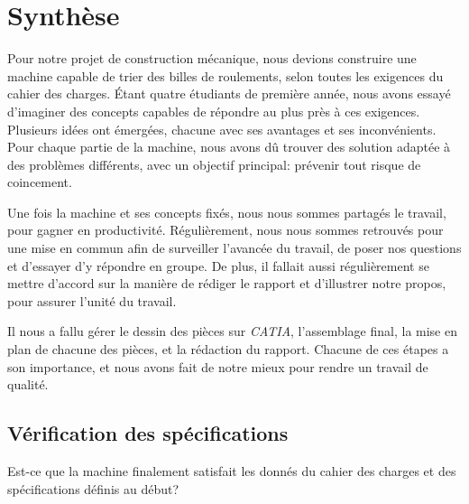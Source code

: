 \chapter{Synthèse}
Pour notre projet de construction mécanique, nous devions construire une machine capable de trier des billes de roulements, selon toutes les exigences du cahier des charges. Étant quatre étudiants de première année, nous avons essayé d'imaginer des concepts capables de répondre au plus près à ces exigences. Plusieurs idées ont émergées, chacune avec ses avantages et ses inconvénients. Pour chaque partie de la machine, nous avons dû trouver des solution adaptée à des problèmes différents, avec un objectif principal: prévenir tout risque de coincement.

Une fois la machine et ses concepts fixés, nous nous sommes partagés le travail, pour gagner en productivité. Régulièrement, nous nous sommes retrouvés pour une mise en commun afin de surveiller l'avancée du travail, de poser nos questions et d'essayer d'y répondre en groupe. De plus, il fallait aussi régulièrement se mettre d'accord sur la manière de rédiger le rapport et d'illustrer notre propos, pour assurer l'unité du travail. 

Il nous a fallu gérer le dessin des pièces sur \emph{CATIA}, l'assemblage final, la mise en plan de chacune des pièces, et la rédaction du rapport. Chacune de ces étapes a son importance, et nous avons fait de notre mieux pour rendre un travail de qualité.

\section{Vérification des spécifications} Est-ce que la machine finalement satisfait les donnés du cahier des charges et des spécifications définis au début?

